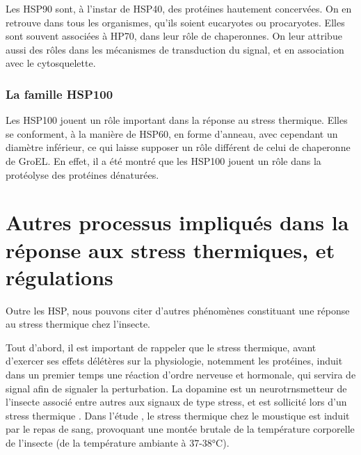  Les HSP90 sont, à l'instar de HSP40, des protéines hautement concervées. On
  en retrouve dans tous les organismes, qu’ils soient eucaryotes ou
  procaryotes. Elles sont souvent associées à HP70, dans leur rôle de
  chaperonnes. On leur attribue aussi des rôles dans les mécanismes de
  transduction du signal, et en association avec le cytosquelette.

\subsubsection{La famille HSP100} %
\label{ssub:la_famille_hsp100}

Les HSP100 jouent un rôle important dans la réponse au stress thermique. %
Elles se conforment, à la manière de HSP60, en forme d'anneau, avec cependant un diamètre inférieur, ce qui laisse supposer un rôle différent de celui de chaperonne de GroEL.
En effet, il a été montré que les HSP100 jouent un rôle dans la protéolyse des protéines dénaturées.

%


	\section{Autres processus impliqués dans la réponse aux stress thermiques, et régulations} %
	\label{sec:rep_misc}
%		

Outre les HSP, nous pouvons citer d'autres phénomènes constituant une réponse au stress thermique chez l'insecte.

Tout d'abord, il est important de rappeler que le stress thermique, avant d'exercer ses effets délétères sur la physiologie, notemment les protéines, induit dans un premier temps une réaction d'ordre nerveuse et hormonale, qui servira de signal afin de signaler la perturbation.
La dopamine est un neurotrnsmetteur de l'insecte associé entre autres aux signaux de type stress, et est sollicité lors d'un stress thermique \cite{andersen2006}. Dans l'étude \cite{andersen2006}, le stress thermique chez le moustique est induit par le repas de sang, provoquant une montée brutale de la température corporelle de l'insecte (de la température ambiante à 37-38°C).


\paragraph{}

